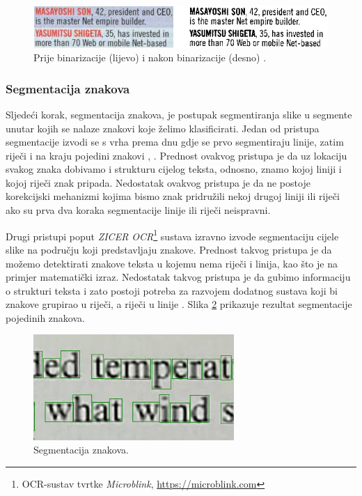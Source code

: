 \documentclass[times, utf8, zavrsni]{fer}
\begin{document}
\

\begin{figure}[htb]
    \centering
    \includegraphics[width=\textwidth]{images/binarization.png}
    \caption{
        Prije binarizacije (lijevo) i nakon binarizacije (desno)
        \citep{Vynckier:2018:HowOcrWorks}.
    }
    \label{fig:binarization}
\end{figure}


\subsubsection{Segmentacija znakova}
\label{subsubsec:segmentacija}
Sljedeći korak, segmentacija znakova, je postupak segmentiranja slike u
segmente unutar kojih se nalaze znakovi koje želimo klasificirati. Jedan od
pristupa segmentacije izvodi se s vrha prema dnu gdje se prvo segmentiraju
linije, zatim riječi i na kraju pojedini znakovi \citep{Jurin:2017:Master},
\citep{Vynckier:2018:HowOcrWorks}. Prednost ovakvog pristupa je da uz lokaciju
svakog znaka dobivamo i strukturu cijelog teksta, odnosno, znamo kojoj liniji i
kojoj riječi znak pripada. Nedostatak ovakvog pristupa je da ne postoje
korekcijski mehanizmi kojima bismo znak pridružili nekoj drugoj liniji ili
riječi ako su prva dva koraka segmentacije linije ili riječi neispravni.
\citep{Jurin:2017:Master}

Drugi pristupi poput \emph{ZICER OCR}\footnote{OCR-sustav tvrtke
\emph{Microblink}, \url{https://microblink.com}} sustava izravno
izvode segmentaciju cijele slike na području koji predstavljaju znakove.
Prednost takvog pristupa je da možemo detektirati znakove teksta u kojemu nema
riječi i linija, kao što je na primjer matematički izraz. Nedostatak takvog
pristupa je da gubimo informaciju o strukturi teksta i zato postoji potreba za
razvojem dodatnog sustava koji bi znakove grupirao u riječi, a riječi u linije
\citep{Jurin:2017:Master}. Slika \ref{fig:segmentation} prikazuje rezultat
segmentacije pojedinih znakova.

\begin{figure}[htb]
    \centering
    \includegraphics[height=4cm]{images/segmentation.png}
    \caption{Segmentacija znakova.}
    \label{fig:segmentation}
\end{figure}
\end{document}
